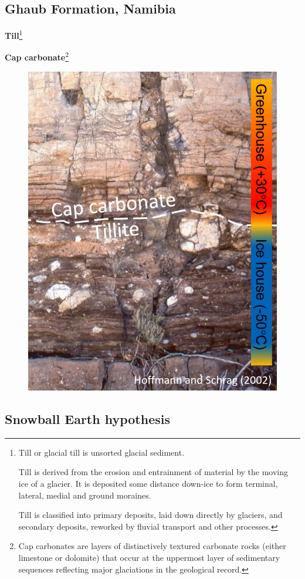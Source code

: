 \subsection{Ghaub Formation, Namibia}

\textbf{Till}\footnote{
Till or glacial till is unsorted glacial sediment.

Till is derived from the erosion and entrainment of material by the moving
ice of a glacier. It is deposited some distance down-ice to form terminal,
lateral, medial and ground moraines.

Till is classified into primary deposits, laid down directly by glaciers,
and secondary deposits, reworked by fluvial transport and other processes.
}

\textbf{Cap carbonate}\footnote{
Cap carbonates are layers of distinctively textured carbonate rocks
(either limestone or dolomite) that occur at the uppermost layer of
sedimentary sequences reflecting major glaciations in the geological record.
}

\begin{figure}[H]
    \centering
    \includegraphics[width=0.75\linewidth]{
    content/img/tillite_and_cap_carbonate.png}
\end{figure}

\subsection{Snowball Earth hypothesis}


